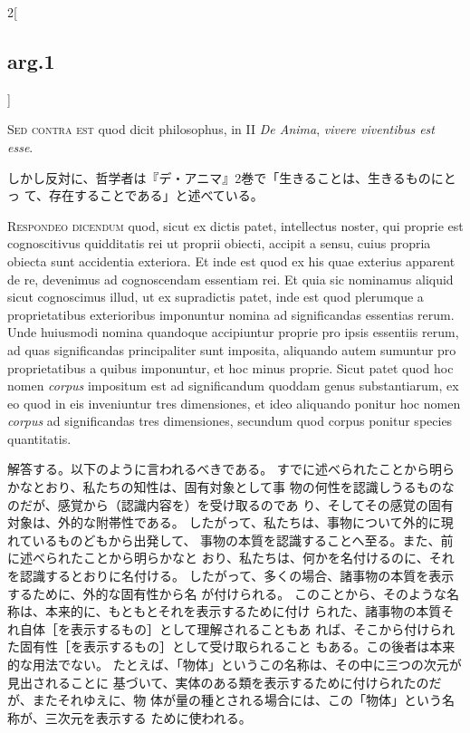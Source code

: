 \documentclass[paper=a4paper,fontsize=10pt,jafontsize=9pt,titlepage]{jlreq}
\begin{document}
\begin{paracol}{2}[\subsection{arg.1}]
\switchcolumn*[\subsection{s.c.}]


{\scshape  Sed contra est} quod dicit philosophus, in II {\itshape De Anima},
 {\itshape vivere viventibus est esse}.

\switchcolumn

しかし反対に、哲学者は『デ・アニマ』2巻で「生きることは、生きるものにとっ
 て、存在することである」と述べている。



{\scshape Respondeo dicendum} quod, sicut ex dictis patet, intellectus
 noster, qui proprie est cognoscitivus quidditatis rei ut proprii
 obiecti, accipit a sensu, cuius propria obiecta sunt accidentia
 exteriora. Et inde est quod ex his quae exterius apparent de re,
 devenimus ad cognoscendam essentiam rei. Et quia sic nominamus aliquid
 sicut cognoscimus illud, ut ex supradictis patet, inde est quod
 plerumque a proprietatibus exterioribus imponuntur nomina ad
 significandas essentias rerum. Unde huiusmodi nomina quandoque
 accipiuntur proprie pro ipsis essentiis rerum, ad quas significandas
 principaliter sunt imposita, aliquando autem sumuntur pro
 proprietatibus a quibus imponuntur, et hoc minus proprie. Sicut patet
 quod hoc nomen {\itshape corpus} impositum est ad significandum quoddam
 genus substantiarum, ex eo quod in eis inveniuntur tres dimensiones, et
 ideo aliquando ponitur hoc nomen {\itshape corpus} ad significandas
 tres dimensiones, secundum quod corpus ponitur species quantitatis.

\switchcolumn

解答する。以下のように言われるべきである。
すでに述べられたことから明らかなとおり、私たちの知性は、固有対象として事
物の何性を認識しうるものなのだが、感覚から（認識内容を）を受け取るのであ
 り、そしてその感覚の固有対象は、外的な附帯性である。
したがって、私たちは、事物について外的に現れているものどもから出発して、
 事物の本質を認識することへ至る。また、前に述べられたことから明らかなと
 おり、私たちは、何かを名付けるのに、それを認識するとおりに名付ける。
したがって、多くの場合、諸事物の本質を表示するために、外的な固有性から名
 が付けられる。
このことから、そのような名称は、本来的に、もともとそれを表示するために付け
 られた、諸事物の本質それ自体［を表示するもの］として理解されることもあ
 れば、そこから付けられた固有性［を表示するもの］として受け取られること
 もある。この後者は本来的な用法でない。
たとえば、「物体」というこの名称は、その中に三つの次元が見出されることに
 基づいて、実体のある類を表示するために付けられたのだが、またそれゆえに、物
 体が量の種とされる場合には、この「物体」という名称が、三次元を表示する
 ために使われる。


\end{paracol}
\end{document}
